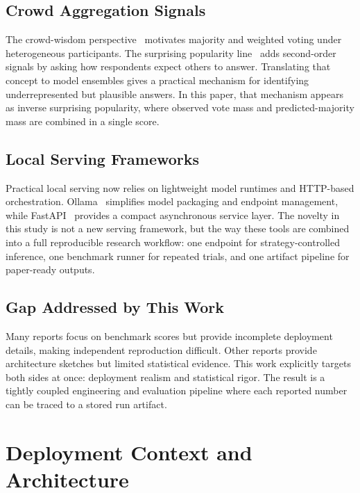 \documentclass[conference]{IEEEtran}
\begin{document}
\subsection{Crowd Aggregation Signals}
The crowd-wisdom perspective~\cite{surowiecki2005wisdom} motivates majority and weighted voting under heterogeneous participants. The surprising popularity line~\cite{prelec2017surprisingly} adds second-order signals by asking how respondents expect others to answer. Translating that concept to model ensembles gives a practical mechanism for identifying underrepresented but plausible answers. In this paper, that mechanism appears as inverse surprising popularity, where observed vote mass and predicted-majority mass are combined in a single score.

\subsection{Local Serving Frameworks}
Practical local serving now relies on lightweight model runtimes and HTTP-based orchestration. Ollama~\cite{ollama} simplifies model packaging and endpoint management, while FastAPI~\cite{fastapi} provides a compact asynchronous service layer. The novelty in this study is not a new serving framework, but the way these tools are combined into a full reproducible research workflow: one endpoint for strategy-controlled inference, one benchmark runner for repeated trials, and one artifact pipeline for paper-ready outputs.

\subsection{Gap Addressed by This Work}
Many reports focus on benchmark scores but provide incomplete deployment details, making independent reproduction difficult. Other reports provide architecture sketches but limited statistical evidence. This work explicitly targets both sides at once: deployment realism and statistical rigor. The result is a tightly coupled engineering and evaluation pipeline where each reported number can be traced to a stored run artifact.

\section{Deployment Context and Architecture}
\end{document}
